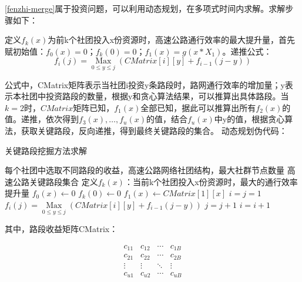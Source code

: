 				\ref{fenzhi-merge}属于投资问题，可以利用动态规划，在多项式时间内求解。求解步骤如下：

				定义$f_k (x)$为前k个社团投入x份资源时，高速公路通行效率的最大提升量，首先赋初始值：$f_0(x)=0$；$f_k(0)=0$；$f_1(x)=g(x*X_{1})$。递推公式：
					$$f_i (j)=\mathop {{\text{Max}}}\limits_{0 \leqslant y \leqslant j} (CMatrix[i][y]+f_{i-1} (j-y))$$

				公式中，CMatrix矩阵表示当社团i投资y条路段时，路网通行效率的增加量；y表示本社团中投资路段的数量，根据y和贪心算法结果，可以推算出具体路段。当$k=2$时，$CMatrix$矩阵已知，$f_1(x)$全部已知，据此可以推算出所有$f_2(x)$的值。递推，依次得到$f_3(x),\dots,f_u(x)$的值，结合$f_u(x)$中y的值，根据贪心算法，获取关键路段，反向递推，得到最终关键路段的集合。
				动态规划伪代码：

				\begin{algorithm}[h]
		        \caption{关键路段挖掘方法求解}  
		        \label{touzi}
		        \begin{algorithmic}[1] %
		            \Require 每个社团中选取不同路段的收益，高速公路网络社团结构，最大社群节点数量
		            \Ensure 高速公路关键路段集合
		                \State 定义$f_k (x)$：当前k个社团投入x份资源时，最大的通行效率提升量
		                \State $f_0 (x)\gets 0$
		                \State $f_k (0)\gets 0$
		                \State $f_1 (x)\gets CMatrix[1][x]$
		                \State $i=j=1$
		                		\State $f_i (j)=\mathop {{\text{Max}}}\limits_{0 \leqslant y \leqslant j} (CMatrix[i][y]+f_{i-1} (j-y))$
		                		\State $j=j+1$
		                	\EndWhile
		                	\State $i=i+1$
		                \EndWhile  
		                \State {}  
		            \EndFunction  
		        \end{algorithmic}  
		    	\end{algorithm} 

		    	其中，路段收益矩阵CMatrix：

				\[\begin{array}{*{20}{c}}
				  {{c_{11}}}&{{c_{12}}}& \cdots &{{c_{1B}}} \\ 
				  {{c_{21}}}&{{c_{22}}}& \cdots &{{c_{2B}}} \\ 
				   \vdots & \vdots & \ddots & \vdots  \\ 
				  {{c_{u1}}}&{{c_{u2}}}& \cdots &{{c_{uB}}} 
				\end{array}\]
				

